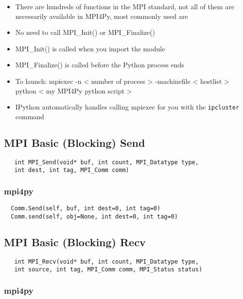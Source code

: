 \documentclass{article}
\begin{document}
\begin{itemize}
\itemsep1pt\parskip0pt
\item
  There are hundreds of functions in the MPI standard, not all of them
  are necessarily available in MPI4Py, most commonly used are
\item
  No need to call MPI\_Init() or MPI\_Finalize()
\item
  MPI\_Init() is called when you import the module
\item
  MPI\_Finalize() is called before the Python process ends
\item
  To launch: mpiexec -n \textless{} number of process \textgreater{}
  -machinefile \textless{} hostlist \textgreater{} python \textless{} my
  MPI4Py python script \textgreater{}
\item
  IPython automatically handles calling mpiexec for you with the
  \texttt{ipcluster} command
\end{itemize}

    \subsection{MPI Basic (Blocking) Send}\label{mpi-basic-blocking-send}

\begin{verbatim}
   int MPI_Send(void* buf, int count, MPI_Datatype type, 
   int dest, int tag, MPI_Comm comm)
\end{verbatim}

\subsubsection{mpi4py}\label{mpi4py}

\begin{verbatim}
  Comm.Send(self, buf, int dest=0, int tag=0)
  Comm.send(self, obj=None, int dest=0, int tag=0)
\end{verbatim}

    \subsection{MPI Basic (Blocking) Recv}\label{mpi-basic-blocking-recv}

\begin{verbatim}
   int MPI_Recv(void* buf, int count, MPI_Datatype type, 
   int source, int tag, MPI_Comm comm, MPI_Status status)
\end{verbatim}

\subsubsection{mpi4py}\label{mpi4py}
\end{document}
